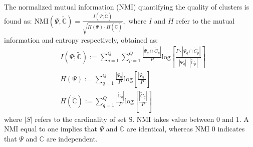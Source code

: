 \documentclass[10pt,final]{IEEEtran}
\begin{document}
The normalized mutual information (NMI) quantifying the quality of clusters is found as:
\newline
\begin{math}
\textrm{NMI}(\Psi,\tilde{\mathbb{C}})=\frac{I(\Psi;\tilde{\mathbb{C}})}{\sqrt{H(\Psi)\cdot H(\tilde{\mathbb{C}}) }},
\end{math}
\newline
where \begin{math}I\end{math} and $H$ refer to the mutual information and entropy respectively, obtained as:
\newline
\begin{align}
& I(\Psi;\tilde{\mathbb{C}}):=\sum_{q=1}^Q\sum_{p=1}^Q
\frac{|\Psi_q \cap \tilde{C}_p|}{P}\textrm{log}\left[
\frac{P\cdot |\Psi_q \cap \tilde{C}_p|}{|\Psi_q|\cdot|\tilde{C}_p|}\right]\nonumber\\
& H(\Psi):=\sum_{q=1}^Q\frac{|\Psi_q |}{P}\textrm{log}\left[
\frac{|\Psi_q|}{P}\right]\nonumber\\
& H(\tilde{\mathbb{C}}):=\sum_{q=1}^Q\frac{|\tilde{C}_q|}{P}\textrm{log}\left[
\frac{|\tilde{C}_q|}{P}\right]
\end{align}
\newline
where $|S|$ refers to the cardinality of set S. NMI takes value between $0$ and $1$. A NMI equal to one implies that $\Psi$ and $\mathbb{C}$ are identical, whereas NMI $0$ indicates that 
$\Psi$ and $\mathbb{C}$ are independent.


\end{document}

